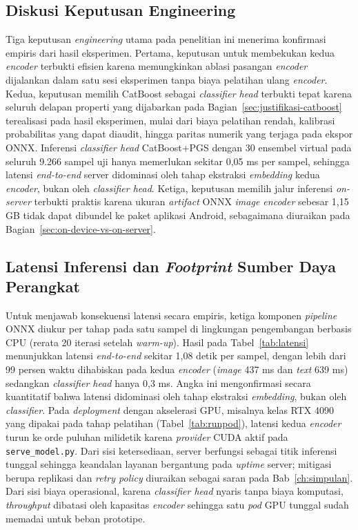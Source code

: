 \subsection{Diskusi Keputusan Engineering}

Tiga keputusan \textit{engineering} utama pada penelitian ini menerima konfirmasi empiris dari hasil eksperimen. Pertama, keputusan untuk membekukan kedua \textit{encoder} terbukti efisien karena memungkinkan ablasi pasangan \textit{encoder} dijalankan dalam satu sesi eksperimen tanpa biaya pelatihan ulang \textit{encoder}. Kedua, keputusan memilih CatBoost sebagai \textit{classifier head} terbukti tepat karena seluruh delapan properti yang dijabarkan pada Bagian~\ref{sec:justifikasi-catboost} terealisasi pada hasil eksperimen, mulai dari biaya pelatihan rendah, kalibrasi probabilitas yang dapat diaudit, hingga paritas numerik yang terjaga pada ekspor ONNX. Inferensi \textit{classifier head} CatBoost+PGS dengan 30 ensembel virtual pada seluruh 9.266 sampel uji hanya memerlukan sekitar 0,05 ms per sampel, sehingga latensi \textit{end-to-end} server didominasi oleh tahap ekstraksi \textit{embedding} kedua \textit{encoder}, bukan oleh \textit{classifier head}. Ketiga, keputusan memilih jalur inferensi \textit{on-server} terbukti praktis karena ukuran \textit{artifact} ONNX \textit{image encoder} sebesar 1,15 GB tidak dapat dibundel ke paket aplikasi Android, sebagaimana diuraikan pada Bagian~\ref{sec:on-device-vs-on-server}.

\subsection{Latensi Inferensi dan \textit{Footprint} Sumber Daya Perangkat}
\label{sec:latensi-footprint}

Untuk menjawab konsekuensi latensi secara empiris, ketiga komponen \textit{pipeline} ONNX diukur per tahap pada satu sampel di lingkungan pengembangan berbasis CPU (rerata 20 iterasi setelah \textit{warm-up}). Hasil pada Tabel~\ref{tab:latensi} menunjukkan latensi \textit{end-to-end} sekitar 1,08 detik per sampel, dengan lebih dari 99 persen waktu dihabiskan pada kedua \textit{encoder} (\textit{image} 437 ms dan \textit{text} 639 ms) sedangkan \textit{classifier head} hanya 0,3 ms. Angka ini mengonfirmasi secara kuantitatif bahwa latensi didominasi oleh tahap ekstraksi \textit{embedding}, bukan oleh \textit{classifier}. Pada \textit{deployment} dengan akselerasi GPU, misalnya kelas RTX 4090 yang dipakai pada tahap pelatihan (Tabel~\ref{tab:runpod}), latensi kedua \textit{encoder} turun ke orde puluhan milidetik karena \textit{provider} CUDA aktif pada \texttt{serve\_model.py}. Dari sisi ketersediaan, server berfungsi sebagai titik inferensi tunggal sehingga keandalan layanan bergantung pada \textit{uptime} server; mitigasi berupa replikasi dan \textit{retry policy} diuraikan sebagai saran pada Bab~\ref{ch:simpulan}. Dari sisi biaya operasional, karena \textit{classifier head} nyaris tanpa biaya komputasi, \textit{throughput} dibatasi oleh kapasitas \textit{encoder} sehingga satu \textit{pod} GPU tunggal sudah memadai untuk beban prototipe.


